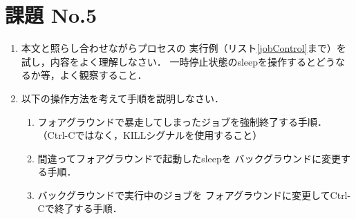 \section*{課題 No.5}
\begin{enumerate}
\item 本文と照らし合わせながらプロセスの
実行例（リスト\ref{jobControl}まで）を試し，内容をよく理解しなさい．
一時停止状態のsleepを操作するとどうなるか等，よく観察すること．

\item 以下の操作方法を考えて手順を説明しなさい．

\begin{enumerate}
\item フォアグラウンドで暴走してしまったジョブを強制終了する手順．
（Ctrl-Cではなく，KILLシグナルを使用すること）

\item 間違ってフォアグラウンドで起動したsleepを
バックグラウンドに変更する手順．

\item バックグラウンドで実行中のジョブを
フォアグラウンドに変更してCtrl-Cで終了する手順．
\end{enumerate}

\end{enumerate}
